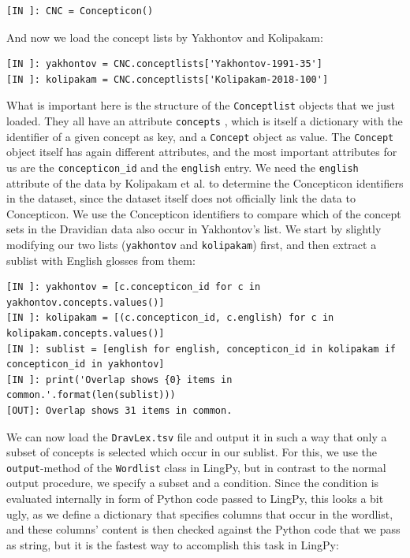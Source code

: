 \documentclass[
  a4paper,
  14pt,
  oneside,
  tablecaptionabove
]{scrbook}
\begin{document}
\begin{lstlisting}[basicstyle=\small]
[IN ]: CNC = Concepticon()
\end{lstlisting}

And now we load the concept lists by Yakhontov and Kolipakam:

\begin{lstlisting}[basicstyle=\small]
[IN ]: yakhontov = CNC.conceptlists['Yakhontov-1991-35']
[IN ]: kolipakam = CNC.conceptlists['Kolipakam-2018-100']
\end{lstlisting}

What is important here is the structure of the \lstinline!Conceptlist!
objects that we just loaded. They all have an attribute
\lstinline!concepts! , which is itself a dictionary with the identifier
of a given concept as key, and a \lstinline!Concept! object as value.
The \lstinline!Concept! object itself has again different attributes,
and the most important attributes for us are the
\lstinline!concepticon_id! and the \lstinline!english! entry. We need
the \lstinline!english! attribute of the data by Kolipakam et al. to
determine the Concepticon identifiers in the dataset, since the dataset
itself does not officially link the data to Concepticon. We use the
Concepticon identifiers to compare which of the concept sets in the
Dravidian data also occur in Yakhontov's list. We start by slightly
modifying our two lists (\lstinline!yakhontov! and
\lstinline!kolipakam!) first, and then extract a sublist with English
glosses from them:

\begin{lstlisting}[basicstyle=\small]
[IN ]: yakhontov = [c.concepticon_id for c in yakhontov.concepts.values()]
[IN ]: kolipakam = [(c.concepticon_id, c.english) for c in  kolipakam.concepts.values()]
[IN ]: sublist = [english for english, concepticon_id in kolipakam if concepticon_id in yakhontov]
[IN ]: print('Overlap shows {0} items in common.'.format(len(sublist))) 
[OUT]: Overlap shows 31 items in common.
\end{lstlisting}

We can now load the \lstinline!DravLex.tsv! file and output it in such a
way that only a subset of concepts is selected which occur in our
sublist. For this, we use the \lstinline!output!-method of the
\lstinline!Wordlist! class in LingPy, but in contrast to the normal
output procedure, we specify a subset and a condition. Since the
condition is evaluated internally in form of Python code passed to
LingPy, this looks a bit ugly, as we define a dictionary that specifies
columns that occur in the wordlist, and these columns' content is then
checked against the Python code that we pass as string, but it is the
fastest way to accomplish this task in LingPy:
\end{document}
